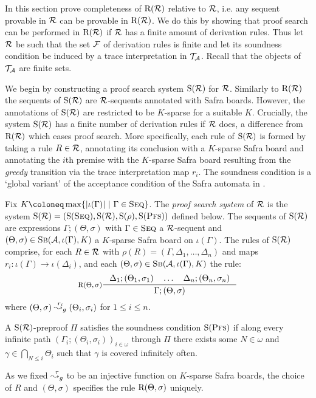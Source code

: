 In this section prove completeness of $\mathrm{R}(\mathcal{R})$ relative to $\mathcal{R}$, i.e. any
sequent provable in $\mathcal{R}$ can be provable in $\mathrm{R}(\mathcal{R})$. We do this by showing
that proof search can be performed in $\mathrm{R}(\mathcal{R})$ if $\mathcal{R}$ has a finite amount of
derivation rules. Thus let $\mathcal{R}$ be such that the set $\mathcal{F}$ of derivation rules
is finite and let its soundness condition be induced by a trace interpretation
in $\mathcal{T}_{\mathcal{A}}$. Recall that the objects of \( \mathcal{T}_{\mathcal{A}} \) are finite sets.

We begin by constructing a proof search system $\mathrm{S}(\mathcal{R})$ for $\mathcal{R}$. Similarly to $\mathrm{R}(\mathcal{R})$ the sequents of
$\mathrm{S}(\mathcal{R})$ are $\mathcal{R}$-sequents annotated with Safra boards. However, the
annotations of $\mathrm{S}(\mathcal{R})$ are restricted to be $K$-sparse for a suitable $K$.
Crucially, the system
$\mathrm{S}(\mathcal{R})$ has a finite number of derivation rules if $\mathcal{R}$ does, a difference
from $\mathrm{R}(\mathcal{R})$ which eases proof search. More specifically, each rule of $\mathrm{S}(\mathcal{R})$
is formed by taking a rule $R \in \mathcal{R}$, annotating its conclusion with a
$K$-sparse Safra board and annotating the $i$th premise with the $K$-sparse Safra
board resulting from the \emph{greedy} transition via the trace interpretation
map $r_i$. The soundness condition is a `global variant' of the acceptance
condition of the Safra automata in .
\begin{definition}\label{def:search-system}
Fix $K \coloneq \max\{\abs{\iota(\Gamma)} ~|~ \Gamma \in \Seq\}$.
  The \emph{proof search system} of $\mathcal{R}$ is the system $\mathrm{S}(\mathcal{R}) =(\mathrm{S}(\textsc{Seq}),
  \mathrm{S}(\mathcal{R}), \mathrm{S}(\rho), \mathrm{S}(\textsc{Pfs}))$ defined below. The sequents of \( \mathrm{S}(\mathcal{R}) \) are
  expressions $\Gamma ; (\Theta, \sigma)$ with $\Gamma \in \textsc{Seq}$ a $\mathcal{R}$-sequent
  and $(\Theta, \sigma) \in \textsc{Sb}(\mathcal{A}, \iota(\Gamma), K)$ a $K$-sparse Safra board
  on $\iota(\Gamma)$.
  The rules of $\mathrm{S}(\mathcal{R})$ comprise, for each $R \in \mathcal{R}$ with
  $\rho(R) = (\Gamma, \Delta_1, \ldots, \Delta_n)$ and maps $r_i \colon \iota(\Gamma)
  \to \iota(\Delta_i)$, and each $(\Theta, \sigma) \in
  \textsc{Sb}(\mathcal{A}, \iota(\Gamma), K)$ the rule:
  \[
    \inference[$\Rrr(\Theta, \sigma)$]{
      \Delta_1 ; (\Theta_1, \sigma_1) \quad
      \ldots \quad
      \Delta_n ; (\Theta_n, \sigma_n)
    }
    {\Gamma ; (\Theta, \sigma)}
  \]
  where \((\Theta, \sigma) \stackrel{r_i}{\leadsto_g} (\Theta_i, \sigma_i)\) for $1 \leq i \leq
  n$.

  A $\mathrm{S}(\mathcal{R})$-preproof $\Pi$ satisfies the soundness condition $\mathrm{S}(\textsc{Pfs})$ if along
  every infinite path $(\Gamma_i ; (\Theta_i, \sigma_i))_{i \in \omega}$ through
  $\Pi$ there
  exists some $N \in \omega$ and $\gamma \in \bigcap_{N \leq i} \Theta_i$ such
  that $\gamma$ is covered infinitely often.
\end{definition}
As we fixed $\stackrel{\tau}{\leadsto_g}$ to be an injective function on $K$-sparse Safra
boards, the choice of $R$ and $(\Theta, \sigma)$ specifies the rule $\mathrm{R}(\Theta,
\sigma)$ uniquely.

